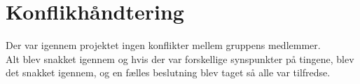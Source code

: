 \section{Konflikhåndtering}
Der var igennem projektet ingen konflikter mellem gruppens medlemmer. \\
Alt blev snakket igennem og hvis der var forskellige synspunkter på tingene, blev det snakket igennem, og en fælles beslutning blev taget så alle var tilfredse.

